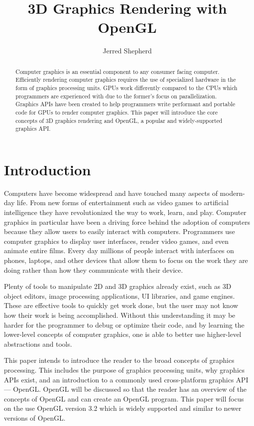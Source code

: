 \documentclass{article}
\title{\Large\textbf{3D Graphics Rendering with OpenGL}}
\author{Jerred Shepherd}
\begin{document}
\begin{titlingpage}
    \maketitle
    \begin{abstract}
    Computer graphics is an essential component to any consumer facing computer. Efficiently rendering computer graphics requires the use of specialized hardware in the form of graphics processing units. GPUs work differently compared to the CPUs which programmers are experienced with due to the former's focus on parallelization. Graphics APIs have been created to help programmers write performant and portable code for GPUs to render computer graphics. This paper will introduce the core concepts of 3D graphics rendering and OpenGL, a popular and widely-supported graphics API.
    \end{abstract}
\end{titlingpage}

\section{Introduction}
Computers have become widespread and have touched many aspects of modern-day life. From new forms of entertainment such as video games to artificial intelligence they have revolutionized the way to work, learn, and play. Computer graphics in particular have been a driving force behind the adoption of computers because they allow users to easily interact with computers. Programmers use computer graphics to display user interfaces, render video games, and even animate entire films. Every day millions of people interact with interfaces on phones, laptops, and other devices that allow them to focus on the work they are doing rather than how they communicate with their device. %

Plenty of tools to manipulate 2D and 3D graphics already exist, such as 3D object editors, image processing applications, UI libraries, and game engines. These are effective tools to quickly get work done, but the user may not know how their work is being accomplished. Without this understanding it may be harder for the programmer to debug or optimize their code, and by learning the lower-level concepts of computer graphics, one is able to better use higher-level abstractions and tools. %

This paper intends to introduce the reader to the broad concepts of graphics processing. This includes the purpose of graphics processing units, why graphics APIs exist, and an introduction to a commonly used cross-platform graphics API --- OpenGL. OpenGL will be discussed so that the reader has an overview of the concepts of OpenGL and can create an OpenGL program. This paper will focus on the use OpenGL version 3.2 which is widely supported and similar to newer versions of OpenGL.
\end{document}

